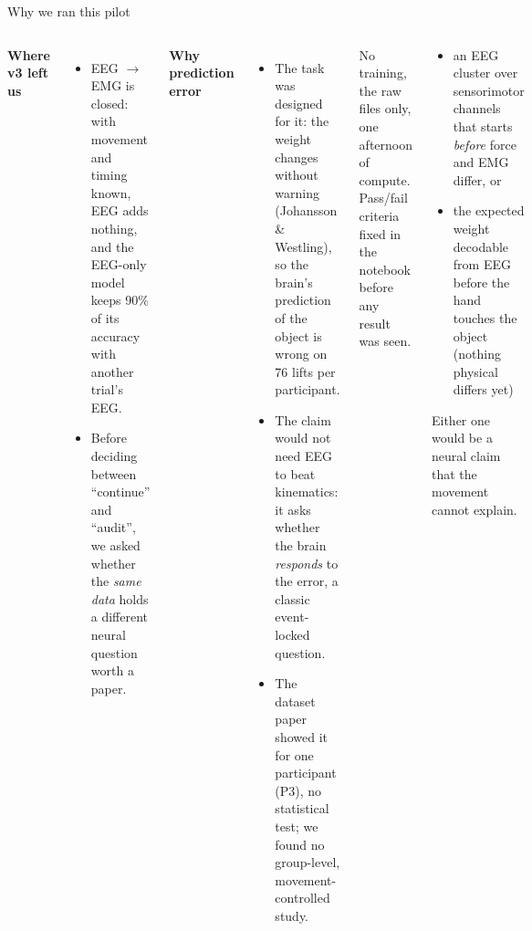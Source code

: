 \documentclass[aspectratio=169,10pt]{beamer}
\begin{document}
\begin{frame}{Why we ran this pilot}
  \begin{columns}[T]
    \textbf{Where v3 left us}
    \begin{itemize}\scriptsize
      \item EEG $\to$ EMG is closed: with movement and timing known, EEG adds nothing, and the EEG-only model keeps
            90\% of its accuracy with another trial's EEG.
      \item Before deciding between ``continue'' and ``audit'', we asked whether the \emph{same data} holds a different
            neural question worth a paper.
    \end{itemize}
    \textbf{Why prediction error}
    \begin{itemize}\scriptsize
      \item The task was designed for it: the weight changes without warning (Johansson \& Westling), so the brain's
            prediction of the object is wrong on 76 lifts per participant.
      \item The claim would not need EEG to beat kinematics: it asks whether the brain \emph{responds} to the error,
            a classic event-locked question.
      \item The dataset paper showed it for one participant (P3), no statistical test; we found no group-level,
            movement-controlled study.
    \end{itemize}
    \begin{tcolorbox}[stagebox,title={Why it was cheap to test}]
      \scriptsize No training, the raw files only, one afternoon of compute. Pass/fail criteria fixed in the notebook
      before any result was seen.
    \end{tcolorbox}
    \begin{tcolorbox}[notebox,title={What a ``go'' would have looked like}]
      \scriptsize
      \begin{itemize}
        \item an EEG cluster over sensorimotor channels that starts \emph{before} force and EMG differ, or
        \item the expected weight decodable from EEG before the hand touches the object (nothing physical differs yet)
      \end{itemize}
      Either one would be a neural claim that the movement cannot explain.
    \end{tcolorbox}
  \end{columns}
\end{frame}
\end{document}
